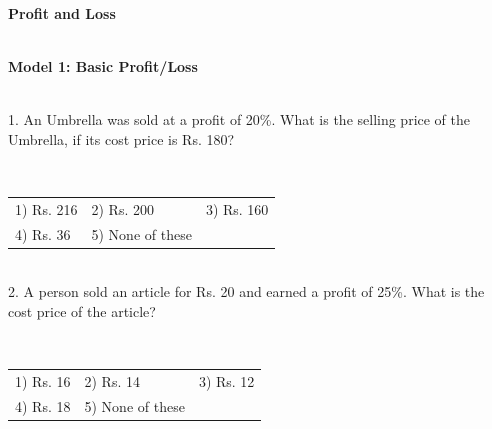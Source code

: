 \documentclass{article}
\begin{document}
	
	\noindent 
	
	\noindent 
	
	\noindent 
	
	\noindent 

	
	\noindent \begin{center}
		{\Large \textbf{Profit and Loss \\}}
	\end{center}
	
	\noindent 
	
	\noindent 
	
	\noindent 
	
	\noindent 
	
	
	\noindent 
	
	\noindent \\ \textbf{Model 1: Basic Profit/Loss}
	
	\noindent 
	
	\noindent \\ 1.   An Umbrella was sold at a profit of 20\%. What is the selling price of the Umbrella, if its cost price is Rs. 180?
	
	
	\noindent  \\ 
	\begin{tabular}{p{1.7in} p{1.6in} p{1.6in}} \\ 
 1) Rs. 216                   & 2) Rs. 200            & 3) Rs. 160            \\
4) Rs. 36              & 5) None of these \\
\end{tabular}
	
	\noindent 
	
	\noindent 
	
	\noindent 
	
	\noindent  \\ 2.   A person sold an article for Rs. 20 and earned a profit of 25\%. What is the cost price of the article?
	
	\noindent  \\ 
	\begin{tabular}{p{1.7in} p{1.6in} p{1.6in}} \\ 
 1) Rs. 16                     & 2) Rs. 14              & 3) Rs. 12              \\
4) Rs. 18              & 5) None of these \\
\end{tabular}
	
\end{document}
